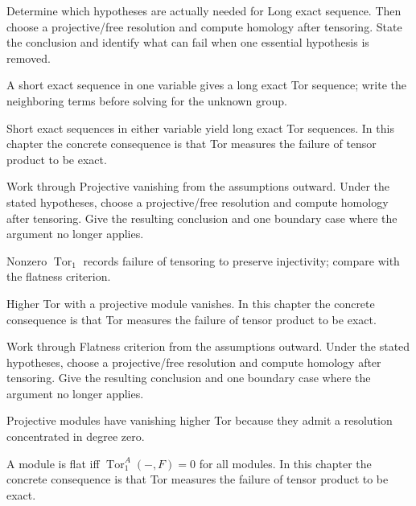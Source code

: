 \begin{exercise}\label{exr:v26-04}
Determine which hypotheses are actually needed for Long exact sequence. Then choose a projective/free resolution and compute homology after tensoring. State the conclusion and identify what can fail when one essential hypothesis is removed.
\end{exercise}
\begin{hint}
A short exact sequence in one variable gives a long exact Tor sequence; write the neighboring terms before solving for the unknown group.
\end{hint}
\begin{solution}
Short exact sequences in either variable yield long exact Tor sequences. In this chapter the concrete consequence is that Tor measures the failure of tensor product to be exact.
\end{solution}

\begin{exercise}\label{exr:v26-05}
Work through Projective vanishing from the assumptions outward. Under the stated hypotheses, choose a projective/free resolution and compute homology after tensoring. Give the resulting conclusion and one boundary case where the argument no longer applies.
\end{exercise}
\begin{hint}
Nonzero \(\operatorname{Tor}_1\) records failure of tensoring to preserve injectivity; compare with the flatness criterion.
\end{hint}
\begin{solution}
Higher Tor with a projective module vanishes. In this chapter the concrete consequence is that Tor measures the failure of tensor product to be exact.
\end{solution}

\begin{exercise}\label{exr:v26-06}
Work through Flatness criterion from the assumptions outward. Under the stated hypotheses, choose a projective/free resolution and compute homology after tensoring. Give the resulting conclusion and one boundary case where the argument no longer applies.
\end{exercise}
\begin{hint}
Projective modules have vanishing higher Tor because they admit a resolution concentrated in degree zero.
\end{hint}
\begin{solution}
A module is flat iff $\operatorname{Tor}_1^A(-,F)=0$ for all modules. In this chapter the concrete consequence is that Tor measures the failure of tensor product to be exact.
\end{solution}

